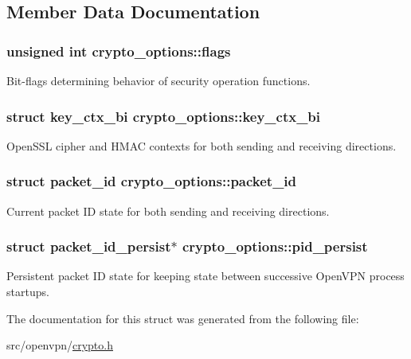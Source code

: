 \subsection{Member Data Documentation}
\hypertarget{structcrypto__options_a4f1cebf03b32cf2f3b44e90630079e88}{}
\subsubsection[{flags}]{\setlength{\rightskip}{0pt plus 5cm}unsigned int crypto\+\_\+options\+::flags}\label{structcrypto__options_a4f1cebf03b32cf2f3b44e90630079e88}
Bit-\/flags determining behavior of security operation functions. \hypertarget{structcrypto__options_a6f5aaea8aa6f397a0684d8b0a2879252}{}
\subsubsection[{key\+\_\+ctx\+\_\+bi}]{\setlength{\rightskip}{0pt plus 5cm}struct {\bf key\+\_\+ctx\+\_\+bi} crypto\+\_\+options\+::key\+\_\+ctx\+\_\+bi}\label{structcrypto__options_a6f5aaea8aa6f397a0684d8b0a2879252}
Open\+S\+S\+L cipher and H\+M\+A\+C contexts for both sending and receiving directions. \hypertarget{structcrypto__options_ab4b7f20d49e1ac2efb9faf4a13d3701d}{}
\subsubsection[{packet\+\_\+id}]{\setlength{\rightskip}{0pt plus 5cm}struct {\bf packet\+\_\+id} crypto\+\_\+options\+::packet\+\_\+id}\label{structcrypto__options_ab4b7f20d49e1ac2efb9faf4a13d3701d}
Current packet I\+D state for both sending and receiving directions. \hypertarget{structcrypto__options_a64268b2eac664d85f5e6133264f937ce}{}
\subsubsection[{pid\+\_\+persist}]{\setlength{\rightskip}{0pt plus 5cm}struct {\bf packet\+\_\+id\+\_\+persist}$\ast$ crypto\+\_\+options\+::pid\+\_\+persist}\label{structcrypto__options_a64268b2eac664d85f5e6133264f937ce}
Persistent packet I\+D state for keeping state between successive Open\+V\+P\+N process startups. 

The documentation for this struct was generated from the following file\+:\begin{DoxyCompactItemize}
\item 
src/openvpn/\hyperlink{crypto_8h}{crypto.\+h}\end{DoxyCompactItemize}
